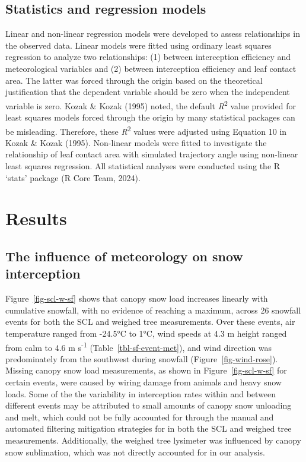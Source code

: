 \documentclass[
  letterpaper,
  DIV=11,
  numbers=noendperiod]{scrartcl}
\begin{document}
\subsection{Statistics and regression
models}\label{statistics-and-regression-models}

Linear and non-linear regression models were developed to assess
relationships in the observed data. Linear models were fitted using
ordinary least squares regression to analyze two relationships: (1)
between interception efficiency and meteorological variables and (2)
between interception efficiency and leaf contact area. The latter was
forced through the origin based on the theoretical justification that
the dependent variable should be zero when the independent variable is
zero. Kozak \& Kozak (1995) noted, the default
\emph{R}\textsuperscript{2} value provided for least squares models
forced through the origin by many statistical packages can be
misleading. Therefore, these \emph{R}\textsuperscript{2} values were
adjusted using Equation 10 in Kozak \& Kozak (1995). Non-linear models
were fitted to investigate the relationship of leaf contact area with
simulated trajectory angle using non-linear least squares regression.
All statistical analyses were conducted using the R `stats' package (R
Core Team, 2024).

\section{Results}\label{results}

\subsection{The influence of meteorology on snow
interception}\label{the-influence-of-meteorology-on-snow-interception}

Figure~\ref{fig-scl-w-sf} shows that canopy snow load increases linearly
with cumulative snowfall, with no evidence of reaching a maximum, across
26 snowfall events for both the SCL and weighed tree measurements. Over
these events, air temperature ranged from -24.5°C to 1°C, wind speeds at
4.3 m height ranged from calm to 4.6 m s\textsuperscript{-1}
(Table~\ref{tbl-sf-event-met}), and wind direction was predominately
from the southwest during snowfall (Figure~\ref{fig-wind-rose}). Missing
canopy snow load measurements, as shown in Figure~\ref{fig-scl-w-sf} for
certain events, were caused by wiring damage from animals and heavy snow
loads. Some of the the variability in interception rates within and
between different events may be attributed to small amounts of canopy
snow unloading and melt, which could not be fully accounted for through
the manual and automated filtering mitigation strategies for in both the
SCL and weighed tree measurements. Additionally, the weighed tree
lysimeter was influenced by canopy snow sublimation, which was not
directly accounted for in our analysis.
\end{document}
